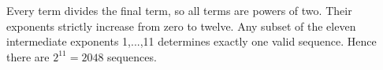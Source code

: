 Every term divides the final term, so all terms are powers of two. Their exponents strictly increase from zero to twelve. Any subset of the eleven intermediate exponents 1,...,11 determines exactly one valid sequence. Hence there are $2^{11}=\boxed{2048}$ sequences.
